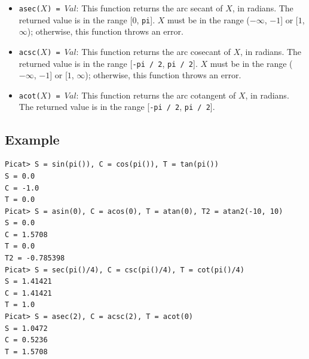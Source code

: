 \begin{itemize}
\item \texttt{asec($X$) = $Val$}: This function returns the arc secant of $X$, in radians.  The returned value is in the range [$0$, \texttt{pi}].  $X$ must be in the range ($-\infty$, $-1$] or [$1$, $\infty$); otherwise, this function throws an error.
\item \texttt{acsc($X$) = $Val$}: This function returns the arc cosecant of $X$, in radians.  The returned value is in the range [\texttt{-pi / 2}, \texttt{pi / 2}].  $X$ must be in the range ($-\infty$, $-1$] or [$1$, $\infty$); otherwise, this function throws an error.
\item \texttt{acot($X$) = $Val$}: This function returns the arc cotangent of $X$, in radians.  The returned value is in the range [\texttt{-pi / 2}, \texttt{pi / 2}].
\end{itemize}

\subsection*{Example}
\begin{verbatim}
Picat> S = sin(pi()), C = cos(pi()), T = tan(pi())
S = 0.0
C = -1.0
T = 0.0
Picat> S = asin(0), C = acos(0), T = atan(0), T2 = atan2(-10, 10)
S = 0.0
C = 1.5708
T = 0.0
T2 = -0.785398
Picat> S = sec(pi()/4), C = csc(pi()/4), T = cot(pi()/4)
S = 1.41421
C = 1.41421
T = 1.0
Picat> S = asec(2), C = acsc(2), T = acot(0)
S = 1.0472
C = 0.5236
T = 1.5708
\end{verbatim}

